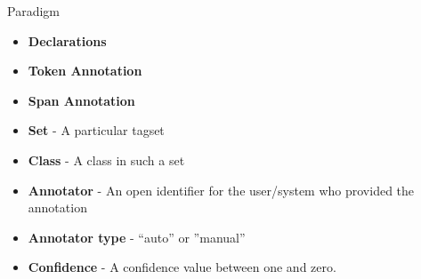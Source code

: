 \documentclass[compress]{beamer}
\begin{document}
\begin{frame}{Paradigm}
    \begin{block}
        \begin{itemize}
            \item \textbf{Declarations}
            \item \textbf{Token Annotation}
            \item \textbf{Span Annotation}
        \end{itemize}
    
        \begin{itemize}
            \item \textbf{Set} - A particular tagset
            \item \textbf{Class} - A class in such a set
            \item \textbf{Annotator} - An open identifier for the user/system who provided the annotation
            \item \textbf{Annotator type} - ``auto'' or ''manual''
            \item \textbf{Confidence} - A confidence value between one and zero.
        \end{itemize}
            
    \end{block}

\end{frame}
\end{document}
